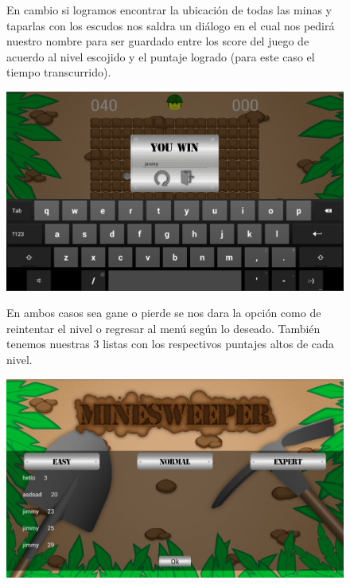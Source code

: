 \documentclass[11pt]{article}
\begin{document}
\begin{figure}[h!]
\begin{minipage}{0.5 \textwidth}
En cambio si logramos encontrar la ubicación de todas las minas y taparlas con los escudos nos saldra un diálogo en el cual nos pedirá nuestro nombre para ser guardado entre los score del juego de acuerdo al nivel escojido y el puntaje logrado (para este caso el tiempo transcurrido).
\end{minipage}
\hfill \begin{minipage}{6.5cm}
\begin{center}
 \includegraphics[width=1\textwidth]{images/screenshot9}
\end{center}
\end{minipage}
\end{figure}

\begin{figure}[h!]
\begin{minipage}{0.5 \textwidth}
En ambos casos sea gane o pierde se nos dara la opción como de reintentar el nivel  o regresar al menú según lo deseado. También tenemos nuestras 3 listas con los respectivos puntajes altos de cada nivel.
\end{minipage}
\hfill \begin{minipage}{6.5cm}
\begin{center}
 \includegraphics[width=1\textwidth]{images/screenshot10}
\end{center}
\end{minipage}
\end{figure}
\end{document}
